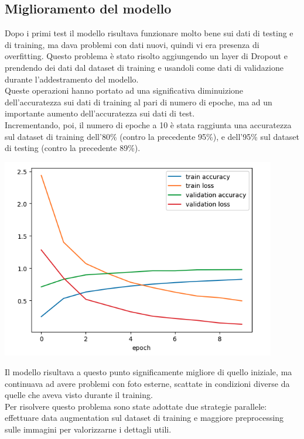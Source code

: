 \documentclass{article}
\begin{document}
\subsection{Miglioramento del modello}
Dopo i primi test il modello risultava funzionare molto bene sui dati di testing e di training, ma dava problemi con dati nuovi, quindi vi era presenza di overfitting. Questo problema è stato risolto aggiungendo un layer di Dropout e prendendo dei dati dal dataset di training e usandoli come dati di validazione durante l'addestramento del modello.\\
Queste operazioni hanno portato ad una significativa diminuizione dell'accuratezza sui dati di training al pari di numero di epoche, ma ad un importante aumento dell'accuratezza sui dati di test. \\
Incrementando, poi, il numero di epoche a 10 è stata raggiunta una accuratezza sul dataset di training dell'80\% (contro la precedente 95\%), e dell'95\% sul dataset di testing (contro la precedente 89\%).
\begin{center}
    \includegraphics[width=0.9\textwidth]{accuracy.png}
\end{center}
Il modello risultava a questo punto significamente migliore di quello iniziale, ma continuava ad avere problemi con foto esterne, scattate in condizioni diverse da quelle che aveva visto durante il training.\\
Per risolvere questo problema sono state adottate due strategie parallele: effettuare data augmentation sul dataset di training e maggiore preprocessing sulle immagini per valorizzarne i dettagli utili.
\end{document}
